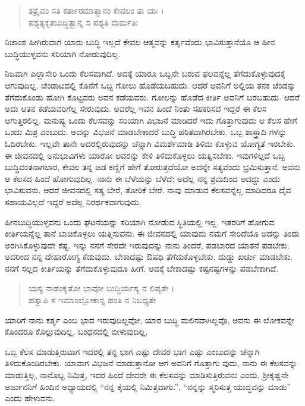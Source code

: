 \begin{verse}
ತತ್ರೈವಂ ಸತಿ ಕರ್ತಾರಮಾತ್ಮಾನಂ ಕೇವಲಂ ತು ಯಃ ।\\ಪಶ್ಯತ್ಯಕೃತಬುದ್ಧಿತ್ವಾನ್ನ ಸ ಪಶ್ಯತಿ ದುರ್ಮತಿಃ 
\end{verse}

{\small ನಿಜಾಂಶ ಹೀಗಿರುವಾಗ ಯಾರು ಬುದ್ಧಿ ಇಲ್ಲದೆ ಕೇವಲ ಆತ್ಮವನ್ನು ಕರ್ತೃವೆಂದು ಭಾವಿಸುತ್ತಾನೆಯೊ ಆ ಹೀನ ಬುದ್ಧಿಯುಳ್ಳವನು ಸರಿಯಾಗಿ ನೋಡುವುದಿಲ್ಲ.}

ನಿಜವಾಗಿ ಎಲ್ಲಾಸೇರಿ ಒಂದು ಕೆಲಸವಾಗಿದೆ. ಅದಕ್ಕೆ ಯಾರೂ ಒಬ್ಬನೇ ಬರುವ ಫಲವನ್ನೆಲ್ಲ ತೆಗೆದುಕೊಳ್ಳುವುದಕ್ಕೆ ಆಗುವುದಿಲ್ಲ. ಚೆಂಡಾಟದಲ್ಲಿ ಕೊನೆಗೆ ಒಬ್ಬ ಗೋಲು ಹೊಡೆಯಬಹುದು. ಆದರೆ ಅವನಿಗೆ ಅಲ್ಲಿಯ ತನಕ ಚೆಂಡನ್ನು ತೆಗೆದುಕೊಂಡು ಹೋಗಿ ಕೊಟ್ಟವರು ಅವನ ಕಡೆಯವರು. ಗೋಲನ್ನು ಹೊಡೆದ ಕೀರ್ತಿ ಅವನಿಗೆ ಬರಬಹುದು. ಆದರೆ ಅದು ಆತನ ಕಡೆಯವರಿಗೆಲ್ಲ ಸೇರುವುದು. ಅವರೆಲ್ಲ ಇವನ ಹಿಂದೆ ನಿಂತು ಸಹಕರಿಸದೆ ಇದ್ದರೆ ಈ ಕೆಲಸ ಆಗುತ್ತಿರಲಿಲ್ಲ. ಮನುಷ್ಯ ಒಂದು ಕೆಲಸವನ್ನು ಸರಿಯಾಗಿ ವಿಭಜನೆ ಮಾಡಿದರೆ ಇದು ಗೊತ್ತಾಗುವುದು ಆ ಕೆಲಸ ಹೇಗೆ ಒಂದು ಮಿಶ್ರ ಎಂಬುದು. ಅದನ್ನು ವಿಭಜನೆ ಮಾಡಬೇಕಾದರೆ ಬುದ್ಧಿ ಹರಿತವಾಗಿರಬೇಕು. ಒಬ್ಬ ಶಾಸ್ತ್ರಾದಿ ಗಳನ್ನು ಓದಿರಬೇಕು. ಇಲ್ಲವೇ ತಾನೇ ಅದರಲ್ಲಿರುವುದನ್ನು ಚೆನ್ನಾಗಿ ವಿಮರ್ಶೆಮಾಡಿ ತಿಳಿದು ಕೊಳ್ಳುವ ಯೋಗ್ಯತೆ ಇರಬೇಕು. ಈ ಜೀವನದಲ್ಲಿ ಅನುಭಾವಿಗಳು ಯಾರೋ ಅವರನ್ನು ಕೇಳಿ ತಿಳಿದುಕೊಳ್ಳಲು ಯತ್ನಿಸಬೇಕು. ಇವುಗಳಿಲ್ಲದೆ ಒಬ್ಬ ಬುದ್ಧಿವಂತನಾಗಲಾರ, ಕೇವಲ ತನ್ನ ಜಡ ಕಣ್ಣಿಗೆ ಹೇಗೆ ತೋರುತ್ತದೆಯೋ ಅದನ್ನೇ ಸತ್ಯವೆಂದು ಭ್ರಮಿಸುತ್ತಾನೆ. ಅವನು ಆ ಕೆಲಸದ ಹಿಂದೆ ಹೋಗುವುದಿಲ್ಲ. ನಾನು ಈ ಬೆಳೆಯನ್ನು ಬೆಳೆದೆ; ಅದೆಲ್ಲ ನನ್ನ ಶ್ರಮದಿಂದ ಆದದ್ದು ಎಂದು ಭಾವಿಸುವನು. ಆದರೆ ಜೀವನದಲ್ಲಿ ಸತ್ಯ ಬೇರೆ, ತೋರಿಕೆ ಬೇರೆ. ನಾವು ಮಾಡುವ ಕೆಲಸವನ್ನೆಲ್ಲ ಮಾಡಿದರೂ ದೈವ ಸಹಾಯವಿಲ್ಲದೆ ಇದ್ದರೆ ಅದೆಲ್ಲ ನಿರರ್ಥಕವಾಗುವುದು.

ಹೀನಬುದ್ಧಿಯುಳ್ಳವನು ಒಂದು ಘಟನೆಯನ್ನು ಸರಿಯಾಗಿ ನೋಡುವ ಸ್ಥಿತಿಯಲ್ಲಿ ಇಲ್ಲ. ಇತರರಿಗೆ ಹೋಗುವ ಕೀರ್ತಿಯನ್ನೆಲ್ಲ ತಾನೆ ಬಾಚಿಕೊಳ್ಳಲು ಯತ್ನಿಸುವನು. ಈ ಜೀವನದಲ್ಲಿ ಯಾವುದು ನಮಗೆ ಸೇರಿದೆಯೊ ಅದನ್ನು ತಿಂದು ಅರಗಿಸಿಕೊಳ್ಳುವುದೇ ಕಷ್ಟ. ಇನ್ನು ನನಗೆ ಸೇರದೇ ಇರುವುದನ್ನು ನಾನು ತಿಂದರೆ, ಪಡಬಾರದ ಯಾತನೆ ಪಡಬೇಕು. ಅದರಿಂದ ನನ್ನ ದೇಹಾರೋಗ್ಯ ಕೆಡುವುದು. ಬೇಕಾದಷ್ಟು ಔಷಧಿ ತೆಗೆದುಕೊಳ್ಳಬೇಕು, ದುಡ್ಡು ಖರ್ಚು ಮಾಡಬೇಕು. ನನಗೆ ಸಲ್ಲದ ಕೀರ್ತಿಯನ್ನು ತೆಗೆದುಕೊಳ್ಳುವುದೂ ಹೀಗೆ. ಅದಕ್ಕೆ ಬೇಕಾದಷ್ಟು ಕಷ್ಟನಷ್ಟಗಳನ್ನು ಪಡಬೇಕಾಗಿದೆ.

\begin{verse}
ಯಸ್ಯ ನಾಹಂಕೃತೋ ಭಾವೋ ಬುದ್ಧಿರ್ಯಸ್ಯ ನ ಲಿಪ್ಯತೇ ।\\ಹತ್ವಾಪಿ ಸ ಇಮಾಂಲ್ಲೋಕಾನ್ನ ಹಂತಿ ನ ನಿಬಧ್ಯತೇ 
\end{verse}

{\small ಯಾರಿಗೆ ನಾನು ಕರ್ತೃ ಎಂಬ ಭಾವ ಇರುವುದಿಲ್ಲವೋ, ಯಾರ ಬುದ್ಧಿ ಮಲಿನವಾಗಿಲ್ಲವೊ, ಅವನು ಈ ಲೋಕವನ್ನೇ ಕೊಂದರೂ ಕೊಲ್ಲುವುದಿಲ್ಲ, ಬಂಧನದಲ್ಲಿ ಬೀಳುವುದಿಲ್ಲ.}

ಒಬ್ಬ ಕೆಲಸ ಮಾಡುತ್ತಿರುವಾಗ ಇದರಲ್ಲಿ ತನ್ನ ಭಾಗ ಎಷ್ಟು ದೇವರ ಭಾಗ ಎಷ್ಟು ಎಂಬುದನ್ನು ಚೆನ್ನಾಗಿ ತಿಳಿದುಕೊಂಡಿರಬೇಕು. ಯಾವಾಗ ವಿಭಜನೆ ಮಾಡುತ್ತಾನೋ ಆಗ ಅವನಿಗೆ ಗೊತ್ತಾಗು ವುದು, ನಾನು ಈ ಕೆಲಸವನ್ನು ಮಾಡುತ್ತಿಲ್ಲ, ನಾನೊಬ್ಬ ನಿಮಿತ್ತ, ಇದರ ಹಿಂದೆ ದೇವರೇ ಈ ಕೆಲಸವನ್ನು ಮಾಡಿಸುತ್ತಿರುವನು ಎಂದು. ಶ್ರೀಕೃಷ್ಣನೇ ಅರ್ಜುನನಿಗೆ ಹಿಂದಿನ ಅಧ್ಯಾಯದಲ್ಲಿ “ನನ್ನ ಕೈಯಲ್ಲಿ ನಿಮಿತ್ತವಾಗು.”, “ನನ್ನನ್ನು ಸ್ಮರಿಸುತ್ತ ಯುದ್ಧವನ್ನು ಮಾಡು” ಎಂದು ಹೇಳುವನು.

